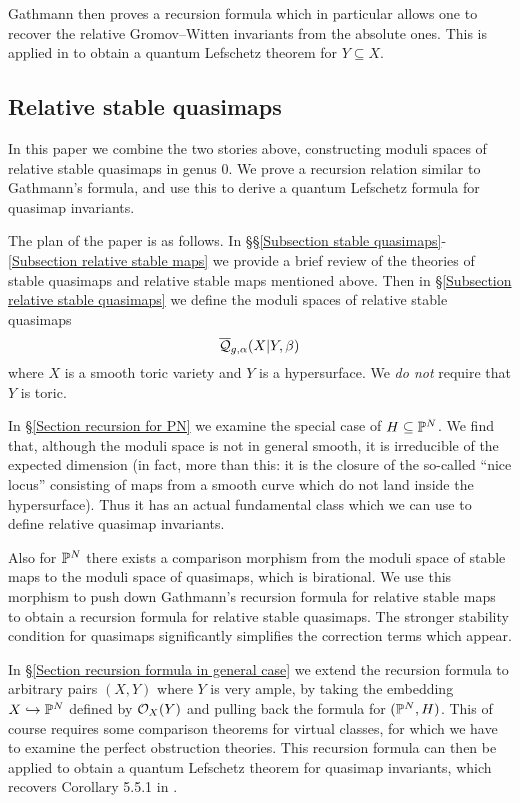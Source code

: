 Gathmann then proves a recursion formula which in particular allows one to recover the relative Gromov--Witten invariants from the absolute ones. This is  applied in \cite{Ga-MF} to obtain a quantum Lefschetz theorem for $Y \subseteq X$.

\subsection{Relative stable quasimaps}
In this paper we combine the two stories above, constructing moduli spaces of relative stable quasimaps in genus $0$. We prove a recursion relation similar to Gathmann's formula, and use this to derive a quantum Lefschetz formula for quasimap invariants.

The plan of the paper is as follows. In \S\S \ref{Subsection stable quasimaps}-\ref{Subsection relative stable maps} we provide a brief review of the theories of stable quasimaps and relative stable maps mentioned above. Then in \S \ref{Subsection relative stable quasimaps} we define the moduli spaces of relative stable quasimaps
\begin{equation*} \overline{\mathcal Q}_{g,\alpha}(X|Y,\beta) \end{equation*}
where $X$ is a smooth toric variety and $Y$ is a hypersurface. We \emph{do not} require that $Y$ is toric.

In \S \ref{Section recursion for PN} we examine the special case of $H \subseteq \mathbb P^N$. We find that, although the moduli space is not in general smooth, it is irreducible of the expected dimension (in fact, more than this: it is the closure of the so-called ``nice locus'' consisting of maps from a smooth curve which do not land inside the hypersurface). Thus it has an actual fundamental class which we can use to define relative quasimap invariants.

Also for $\mathbb P^N$ there exists a comparison morphism from the moduli space of stable maps to the moduli space of quasimaps, which is birational. We use this morphism to push down Gathmann's recursion formula for relative stable maps to obtain a recursion formula for relative stable quasimaps. The stronger stability condition for quasimaps significantly simplifies the correction terms which appear.

In \S \ref{Section recursion formula in general case} we extend the recursion formula to arbitrary pairs $(X,Y)$ where $Y$ is very ample, by taking the embedding $X \hookrightarrow \mathbb P^N$ defined by $\mathcal{O}_X(Y)$ and pulling back the formula for $(\mathbb P^N,H)$. This of course requires some comparison theorems for virtual classes, for which we have to examine the perfect obstruction theories. This recursion formula can then be applied to obtain a quantum Lefschetz theorem for quasimap invariants, which recovers Corollary 5.5.1 in \cite{CF-K-wallcrossing}.


